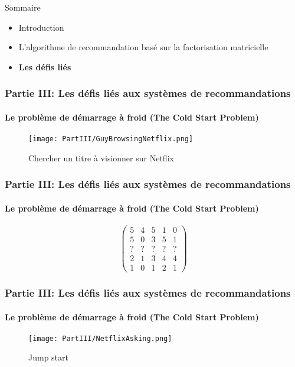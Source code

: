 
\begin{frame}{Sommaire}
    \begin{itemize}
        \item Introduction
        \item L'algorithme de recommandation basé sur la factorisation matricielle
        \item \textbf{Les défis liés}
    \end{itemize}
\end{frame}

\begin{frame}

    \frametitle{Partie III: Les défis liés aux systèmes de recommandations}
    \framesubtitle{Le problème de démarrage à froid (The Cold Start Problem)}

    \begin{figure}
        \centering
        \texttt{[image: PartIII/GuyBrowsingNetflix.png]}
        \caption{Chercher un titre à visionner sur Netflix}
    \end{figure}

\end{frame}

\begin{frame}

    \frametitle{Partie III: Les défis liés aux systèmes de recommandations}
    \framesubtitle{Le problème de démarrage à froid (The Cold Start Problem)}

    \begin{figure}
        \[
            \begin{pmatrix}
                5 & 4 & 5 & 1 & 0 \\
                5 & 0 & 3 & 5 & 1 \\
                ? & ? & ? & ? & ? \\
                2 & 1 & 3 & 4 & 4 \\
                1 & 0 & 1 & 2 & 1
            \end{pmatrix}
        \]

    \end{figure}

\end{frame}

\begin{frame}

    \frametitle{Partie III: Les défis liés aux systèmes de recommandations}
    \framesubtitle{Le problème de démarrage à froid (The Cold Start Problem)}

    \begin{figure}
        \centering
        \texttt{[image: PartIII/NetflixAsking.png]}
        \caption{Jump start}
    \end{figure}

\end{frame}


